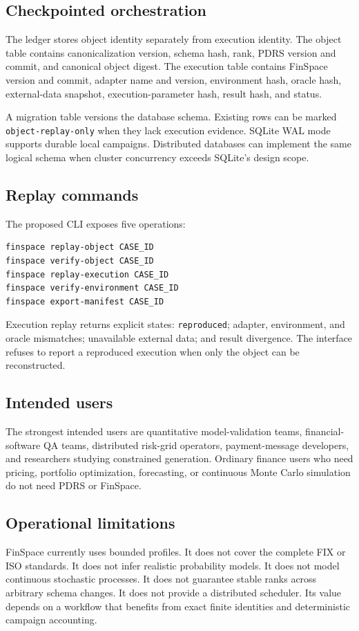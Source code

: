 \subsection{Checkpointed orchestration}
The ledger stores object identity separately from execution identity. The object table contains canonicalization version, schema hash, rank, PDRS version and commit, and canonical object digest. The execution table contains FinSpace version and commit, adapter name and version, environment hash, oracle hash, external-data snapshot, execution-parameter hash, result hash, and status.

A migration table versions the database schema. Existing rows can be marked \texttt{object-replay-only} when they lack execution evidence. SQLite WAL mode supports durable local campaigns. Distributed databases can implement the same logical schema when cluster concurrency exceeds SQLite's design scope.

\subsection{Replay commands}
The proposed CLI exposes five operations:
\begin{verbatim}
finspace replay-object CASE_ID
finspace verify-object CASE_ID
finspace replay-execution CASE_ID
finspace verify-environment CASE_ID
finspace export-manifest CASE_ID
\end{verbatim}
Execution replay returns explicit states: \texttt{reproduced}; adapter, environment, and oracle mismatches; unavailable external data; and result divergence. The interface refuses to report a reproduced execution when only the object can be reconstructed.

\subsection{Intended users}
The strongest intended users are quantitative model-validation teams, financial-software QA teams, distributed risk-grid operators, payment-message developers, and researchers studying constrained generation. Ordinary finance users who need pricing, portfolio optimization, forecasting, or continuous Monte Carlo simulation do not need PDRS or FinSpace.

\subsection{Operational limitations}
FinSpace currently uses bounded profiles. It does not cover the complete FIX or ISO standards. It does not infer realistic probability models. It does not model continuous stochastic processes. It does not guarantee stable ranks across arbitrary schema changes. It does not provide a distributed scheduler. Its value depends on a workflow that benefits from exact finite identities and deterministic campaign accounting.
